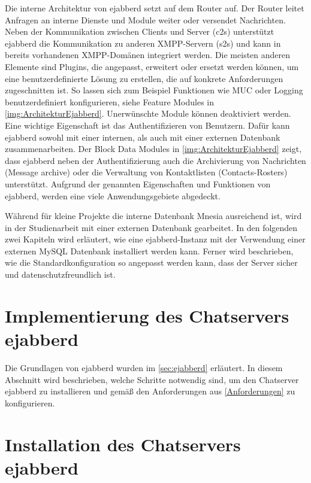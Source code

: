 \documentclass[a4paper,titlepage,halfparskip,12pt]{scrreprt}
\begin{document}
\begin{onehalfspacing}
Die interne Architektur von ejabberd setzt auf dem Router auf. Der Router leitet Anfragen an interne Dienste und Module weiter oder versendet Nachrichten. Neben der Kommunikation zwischen Clients und Server (c2s) unterstützt ejabberd die Kommunikation zu anderen \ac{XMPP}-Servern (s2s) und kann in bereits vorhandenen \ac{XMPP}-Domänen integriert werden. Die meisten anderen Elemente sind Plugins, die angepasst, erweitert oder ersetzt werden können, um eine benutzerdefinierte Lösung zu erstellen, die auf konkrete Anforderungen zugeschnitten ist. So lassen sich zum Beispiel Funktionen wie \ac{MUC} oder Logging benutzerdefiniert konfigurieren, siehe Feature Modules in \autoref{img:ArchitekturEjabberd}. Unerwünschte Module können deaktiviert werden. Eine wichtige Eigenschaft ist das Authentifizieren von Benutzern. Dafür kann ejabberd sowohl mit einer internen, als auch mit einer externen Datenbank zusammenarbeiten. Der Block Data Modules in \autoref{img:ArchitekturEjabberd} zeigt, dass ejabberd neben der Authentifizierung auch die Archivierung von Nachrichten (Message archive) oder die Verwaltung von Kontaktlisten (Contacts-Rosters) unterstützt. Aufgrund der genannten Eigenschaften und Funktionen von ejabberd, werden eine viele Anwendungsgebiete abgedeckt.\cite{ejabberdModulesDeployment, ejabberdDoc}

Während für kleine Projekte die interne Datenbank Mnesia ausreichend ist, wird in der Studienarbeit mit einer externen Datenbank gearbeitet. In den folgenden zwei Kapiteln wird erläutert, wie eine ejabberd-Instanz mit der Verwendung einer externen MySQL Datenbank installiert werden kann. Ferner wird beschrieben, wie die Standardkonfiguration so angepasst werden kann, dass der Server sicher und datenschutzfreundlich ist.

\pagebreak

\section{Implementierung des Chatservers ejabberd}
\label{sec:ChatserverEntwicklung}

Die Grundlagen von ejabberd wurden im \autoref{sec:ejabberd} erläutert. In diesem Abschnitt wird beschrieben, welche Schritte notwendig sind, um den Chatserver ejabberd zu installieren und gemäß den Anforderungen aus \autoref{Anforderungen} zu konfigurieren.

\section{Installation des Chatservers ejabberd}
\label{sec:InstallationEjabberd}


\end{onehalfspacing}
\end{document}
